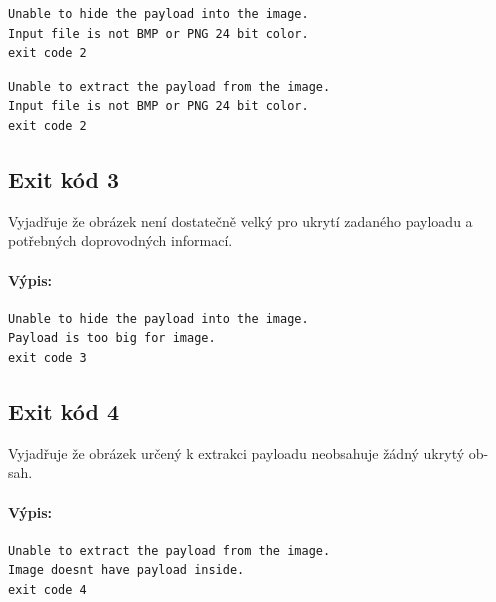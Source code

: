 \documentclass[12pt]{report}
\begin{document}
    \begin{mdframed}
        \begin{verbatim}
Unable to hide the payload into the image.
Input file is not BMP or PNG 24 bit color.
exit code 2
        \end{verbatim}
    \end{mdframed}

    \begin{mdframed}
        \begin{verbatim}
Unable to extract the payload from the image.
Input file is not BMP or PNG 24 bit color.
exit code 2
        \end{verbatim}
    \end{mdframed}

    \subsection{Exit kód 3}
    Vyjadřuje že obrázek není dostatečně velký pro ukrytí zadaného payloadu a
    potřebných doprovodných informací.

    \paragraph{Výpis:}

    \begin{mdframed}
        \begin{verbatim}
Unable to hide the payload into the image.
Payload is too big for image.
exit code 3
        \end{verbatim}
    \end{mdframed}

    \subsection{Exit kód 4}
    Vyjadřuje že obrázek určený k extrakci payloadu neobsahuje žádný ukrytý ob-
    sah.\\

    \paragraph{Výpis:}

    \begin{mdframed}
        \begin{verbatim}
Unable to extract the payload from the image.
Image doesnt have payload inside.
exit code 4
        \end{verbatim}
    \end{mdframed}
\end{document}
